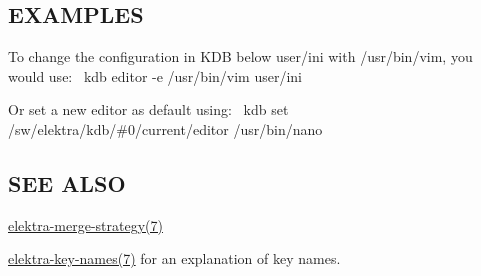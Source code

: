 \subsection*{E\+X\+A\+M\+P\+L\+ES}

To change the configuration in K\+DB below {\ttfamily user/ini} with {\ttfamily /usr/bin/vim}, you would use\+:~\newline
 {\ttfamily kdb editor -\/e /usr/bin/vim user/ini}

Or set a new editor as default using\+:~\newline
 {\ttfamily kdb set /sw/elektra/kdb/\#0/current/editor /usr/bin/nano}

\subsection*{S\+EE A\+L\+SO}


\begin{DoxyItemize}
\item \hyperlink{md_doc_help_elektra-merge-strategy_doc_help_elektra-merge-strategy_md}{elektra-\/merge-\/strategy(7)}
\item \hyperlink{md_doc_help_elektra-key-names_doc_help_elektra-key-names_md}{elektra-\/key-\/names(7)} for an explanation of key names. 
\end{DoxyItemize}